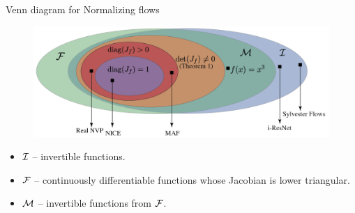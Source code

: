 \documentclass{beamer}
\begin{document}
\begin{frame}{Venn diagram for Normalizing flows}
	
	\begin{figure}
		\centering
		\includegraphics[width=\linewidth]{figs/venn_diagram}
	\end{figure}
	\begin{itemize}
		\item $\mathcal{I}$ -- invertible functions.
		\item $\mathcal{F}$ -- continuously differentiable functions whose Jacobian is lower triangular.
		\item $\mathcal{M}$ -- invertible functions from $\mathcal{F}$.
	\end{itemize}
\end{frame}
\end{document}
